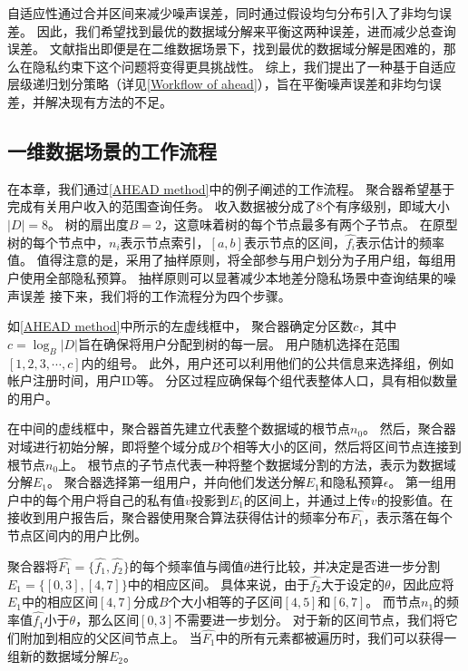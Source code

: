 自适应性通过合并区间来减少噪声误差，同时通过假设均匀分布引入了非均匀误差。
因此，我们希望找到最优的数据域分解来平衡这两种误差，进而减少总查询误差。
文献\cite{muthukrishnan1999rectangular}指出即便是在二维数据场景下，找到最优的数据域分解是困难的，那么在隐私约束下这个问题将变得更具挑战性。 
综上，我们提出了一种基于自适应层级递归划分策略（详见\autoref{Workflow of ahead}），旨在平衡噪声误差和非均匀误差，并解决现有方法的不足。

\subsection{一维数据场景\myahead 的工作流程}
\label{Workflow of ahead}
在本章，我们通过\autoref{AHEAD method}中的例子阐述\myahead 的工作流程。
聚合器希望基于\myahead 完成有关用户收入的范围查询任务。
收入数据被分成了8个有序级别，即域大小$|D|=8$。
树的扇出度$B=2$，这意味着\myahead 树的每个节点最多有两个子节点。
在\myahead 原型树的每个节点中，$n_i$表示节点索引，$[a,b]$表示节点的区间，$\hat{f_i}$表示估计的频率值。
值得注意的是，\myahead 采用了抽样原则\cite{cormode2019answering}，将全部参与用户划分为子用户组，每组用户使用全部隐私预算。
抽样原则可以显著减少本地差分隐私场景中查询结果的噪声误差\cite{nguyen2016collecting, wang2017locally, wang2019locally}
接下来，我们将\myahead 的工作流程分为四个步骤。

如\autoref{AHEAD method}中所示的左虚线框中，
聚合器确定分区数$c$，其中$c=\log_B|D|$旨在确保将用户分配到\myahead 树的每一层。
用户随机选择在范围$[1,2,3,\cdots,c]$内的组号。
此外，用户还可以利用他们的公共信息来选择组，例如帐户注册时间，用户ID等。
分区过程应确保每个组代表整体人口，具有相似数量的用户。

在中间的虚线框中，聚合器首先建立代表整个数据域的根节点$n_0$。
然后，聚合器对域进行初始分解，即将整个域分成$B$个相等大小的区间，然后将区间节点连接到根节点$n_0$上。
根节点的子节点代表一种将整个数据域分割的方法，表示为数据域分解$E_1$。
聚合器选择第一组用户，并向他们发送分解$E_1$和隐私预算$\epsilon$。
第一组用户中的每个用户将自己的私有值$v$投影到$E_1$的区间上，并通过\oue 上传$v$的投影值。在接收到用户报告后，聚合器使用聚合算法获得估计的频率分布$\hat{F_1}$，表示落在每个节点区间内的用户比例。

聚合器将$\hat{F_1}=\{\hat{f_1}, \hat{f_2}\}$的每个频率值与阈值$\theta$进行比较，并决定是否进一步分割$E_1=\{[0,3], [4,7]\}$中的相应区间。
具体来说，由于$\hat{f_2}$大于设定的$\theta$，因此应将$E_1$中的相应区间$[4,7]$分成$B$个大小相等的子区间$[4,5]$和$[6,7]$。
而节点$n_1$的频率值$\hat{f_1}$小于$\theta$，那么区间$[0,3]$不需要进一步划分。
对于新的区间节点，我们将它们附加到相应的父区间节点上。
当$\hat{F_1}$中的所有元素都被遍历时，我们可以获得一组新的数据域分解$E_{2}$。

